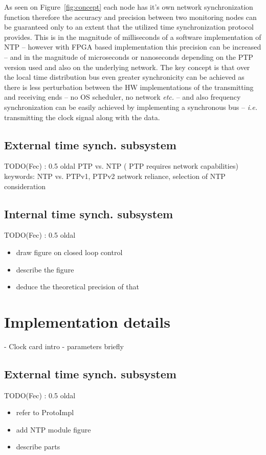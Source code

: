 \documentclass[article]{IEEEtran}
\begin{document}
As seen on Figure~\ref{fig:concept} each node has it's own network synchronization function therefore the accuracy and
precision between two monitoring nodes can be guaranteed only to an extent that the utilized time synchronization
protocol provides. This is in the magnitude of milliseconds of a software implementation of NTP -- however with FPGA based implementation
this precision can be increased --  and in the magnitude of
microseconds or nanoseconds depending on the PTP version used and also on the underlying network.
The key concept is that over the local time distribution bus even greater synchronicity can be achieved as there is less
perturbation between the HW implementations of the transmitting and receiving ends -- no OS scheduler, no network \emph{etc.} --
and also frequency synchronization can be easily achieved by implementing a synchronous bus -- \emph{i.e.} transmitting the
clock signal along with the data.

\subsection{External time synch. subsystem}
TODO(Fec) : 0.5 oldal PTP vs. NTP ( PTP requires network capabilities)
keywords: NTP vs. PTPv1, PTPv2 network reliance, selection of NTP consideration

\subsection{Internal time synch. subsystem}
TODO(Fec) : 0.5 oldal
 \begin{itemize}
 	\item draw figure on closed loop control 
 	\item describe the figure
 	\item deduce the theoretical precision of that
 \end{itemize}

\section{Implementation details}

- Clock card intro 
- parameters briefly

\subsection{External time synch. subsystem}
TODO(Fec) : 0.5 oldal
 \begin{itemize}
 	\item refer to ProtoImpl
 	\item add NTP module figure
 	\item describe parts
 \end{itemize}
\end{document}
